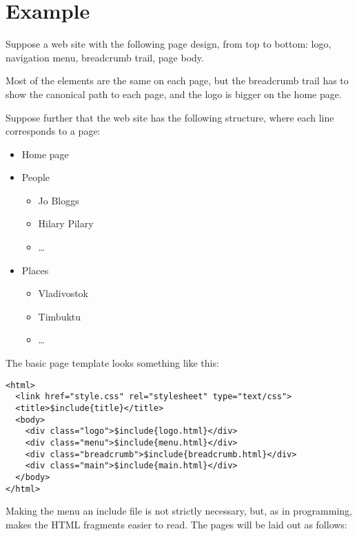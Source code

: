 \documentclass[english]{scrartcl}
\begin{document}
\section{Example}

Suppose a web site with the following page design, from top to bottom:
logo, navigation menu, breadcrumb trail, page body.

Most of the elements are the same on each page, but the breadcrumb
trail has to show the canonical path to each page, and the logo is
bigger on the home page.

Suppose further that the web site has the following structure, where
each line corresponds to a page:

\begin{itemize}
\item Home page
\item People
  \begin{itemize}
  \item Jo Bloggs
  \item Hilary Pilary
  \item \dots
  \end{itemize}
\item Places
  \begin{itemize}
  \item Vladivostok
  \item Timbuktu
  \item \dots
  \end{itemize}
\end{itemize}

The basic page template looks something like this:

\begin{verbatim}
<html>
  <link href="style.css" rel="stylesheet" type="text/css">
  <title>$include{title}</title>
  <body>
    <div class="logo">$include{logo.html}</div>
    <div class="menu">$include{menu.html}</div>
    <div class="breadcrumb">$include{breadcrumb.html}</div>
    <div class="main">$include{main.html}</div>
  </body>
</html>
\end{verbatim}

Making the menu an include file is not strictly necessary, but, as in
programming, makes the HTML fragments easier to read. The pages will
be laid out as follows:
\end{document}
